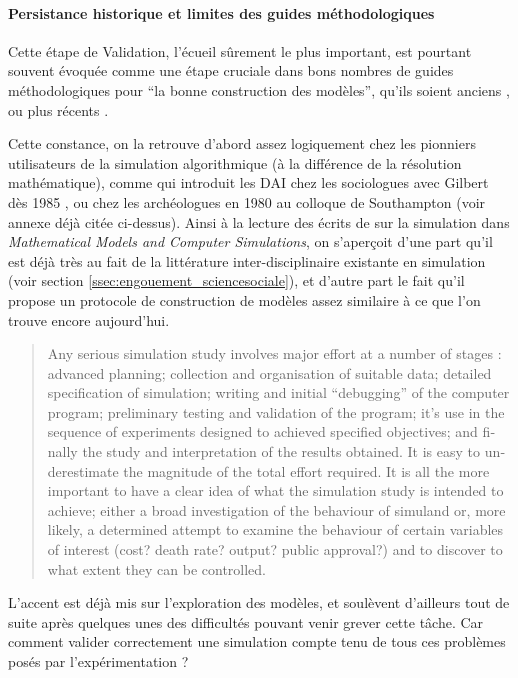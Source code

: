\paragraph{Persistance historique et limites des guides méthodologiques}

Cette étape de Validation, l'écueil sûrement le plus important, est pourtant souvent évoquée comme une étape cruciale dans bons nombres de guides méthodologiques pour \enquote{la bonne construction des modèles}, qu'ils soient anciens \autocites[195]{Beshers1965}{Guetzkow1972, Dutton1971,Naylor1966, Naylor1967}, ou plus récents \autocite{Amblard2006, Gilbert2008}.

Cette constance, on la retrouve d'abord assez logiquement chez les pionniers utilisateurs de la simulation algorithmique (à la différence de la résolution mathématique), comme \textcite{Doran1975, Doran1986} qui introduit les DAI chez les sociologues avec Gilbert dès 1985 \autocite{Gilbert1985}, ou chez les archéologues en 1980 au colloque de Southampton \autocites{Doran1982, Renfrew1982} (voir annexe déjà citée ci-dessus). Ainsi à la lecture des écrits de \textcite[300-301]{Doran1975} sur la simulation dans \textit{Mathematical Models and Computer Simulations}, on s'aperçoit d'une part qu'il est déjà très au fait de la littérature inter-disciplinaire existante en simulation \autocite{Guetzkow1972} (voir section \ref{ssec:engouement_sciencesociale}), et d'autre part le fait qu'il propose un protocole de construction de modèles assez similaire à ce que l'on trouve encore aujourd'hui.

\foreignblockquote{english}[\cite{Guetzkow1972}]{Any serious simulation study involves major effort at a number of stages : advanced planning; collection and organisation of suitable data; detailed specification of simulation; writing and initial \enquote{debugging} of the computer program; preliminary testing and validation of the program; it's use in the sequence of experiments designed to achieved specified objectives; and finally the study and interpretation of the results obtained. It is easy to underestimate the magnitude of the total effort required. It is all the more important to have a clear idea of what the simulation study is intended to achieve; either a broad investigation of the behaviour of simuland or, more likely, a determined attempt to examine the behaviour of certain variables of interest (cost? death rate? output? public approval?) and to discover to what extent they can be controlled.}

L'accent est déjà mis sur l'exploration des modèles, et \textcite[301]{Doran1975} soulèvent d'ailleurs tout de suite après quelques unes des difficultés pouvant venir grever cette tâche. Car comment valider correctement une simulation compte tenu de tous ces problèmes posés par l'expérimentation ?

